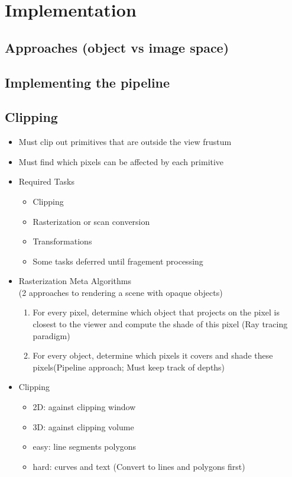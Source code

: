 \documentclass[11pt,a4paper]{article}
\begin{document}
\section{Implementation}
	\subsection{Approaches (object vs image space)}
	\subsection{Implementing the pipeline}
	\subsection{Clipping}
		\begin{itemize}
			\item Must clip out primitives that are outside the view frustum
			\item Must find which pixels can be affected by each primitive
			\item Required Tasks
				\begin{itemize}
					\item Clipping
					\item Rasterization or scan conversion
					\item Transformations 
					\item Some tasks deferred until fragement processing
				\end{itemize}
			\item Rasterization Meta Algorithms\\(2 approaches to rendering a scene with opaque objects)
				\begin{enumerate}
					\item For every pixel, determine which object that projects on the pixel is closest to the viewer and compute the shade of this pixel (Ray tracing paradigm)
					\item For every object, determine which pixels it covers and shade these pixels(Pipeline approach; Must keep track of depths)
				\end{enumerate}
			\item Clipping
				\begin{itemize}
					\item 2D: against clipping window
					\item 3D: against clipping volume
					\item easy: line segments polygons
					\item hard: curves and text (Convert to lines and polygons first)

\end{itemize}
\end{itemize}
\end{document}
